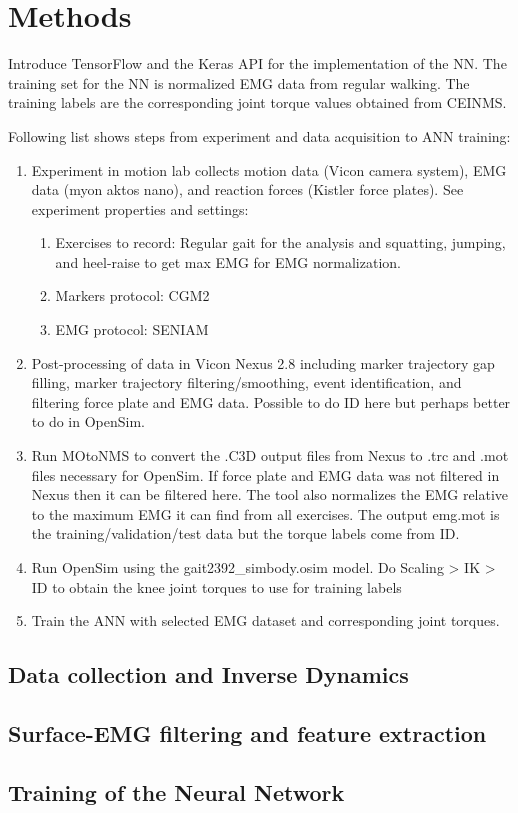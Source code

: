 \documentclass[../main.tex]{subfiles}
\begin{document}
\chapter{Methods}
Introduce TensorFlow and the Keras API for the implementation of the \ac{NN}.
The training set for the \ac{NN} is normalized EMG data from regular walking.
The training labels are the corresponding joint torque values obtained from CEINMS.

Following list shows steps from experiment and data acquisition to ANN training:
\begin{enumerate}
    \item Experiment in motion lab collects motion data (Vicon camera system), EMG data (myon aktos nano), and reaction forces (Kistler force plates). See experiment properties and settings:
    \begin{enumerate}
        \item Exercises to record: Regular gait for the analysis and squatting, jumping, and heel-raise to get max EMG for EMG normalization.
        \item Markers protocol: CGM2
        \item EMG protocol: SENIAM
    \end{enumerate}
    \item Post-processing of data in Vicon Nexus 2.8 including marker trajectory gap filling, marker trajectory filtering/smoothing, event identification, and filtering force plate and EMG data. Possible to do ID here but perhaps better to do in OpenSim.
    \item Run MOtoNMS to convert the .C3D output files from Nexus to .trc and .mot files necessary for OpenSim. If force plate and EMG data was not filtered in Nexus then it can be filtered here. The tool also normalizes the EMG relative to the maximum EMG it can find from all exercises. The output emg.mot is the training/validation/test data but the torque labels come from ID.
    \item Run OpenSim using the gait2392\_simbody.osim model. Do Scaling > IK > ID to obtain the knee joint torques to use for training labels
    \item Train the ANN with selected EMG dataset and corresponding joint torques.
\end{enumerate}



\section{Data collection and Inverse Dynamics}

\section{Surface-EMG filtering and feature extraction}

\section{Training of the Neural Network}
\end{document}
